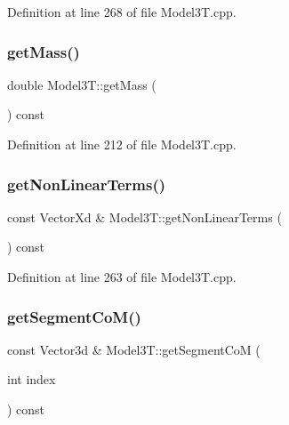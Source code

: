 Definition at line 268 of file Model3\+T.\+cpp.

\hypertarget{classModel3T_a226c740338e57180fafed23181d1ca85}{}\label{classModel3T_a226c740338e57180fafed23181d1ca85} 
\subsubsection{\texorpdfstring{get\+Mass()}{getMass()}}
{\footnotesize\ttfamily double Model3\+T\+::get\+Mass (\begin{DoxyParamCaption}{ }\end{DoxyParamCaption}) const\hspace{0.3cm}{\ttfamily [virtual]}}



Definition at line 212 of file Model3\+T.\+cpp.

\hypertarget{classModel3T_af41d3f87cb77877320f4c589d9cf7ffe}{}\label{classModel3T_af41d3f87cb77877320f4c589d9cf7ffe} 
\subsubsection{\texorpdfstring{get\+Non\+Linear\+Terms()}{getNonLinearTerms()}}
{\footnotesize\ttfamily const Vector\+Xd \& Model3\+T\+::get\+Non\+Linear\+Terms (\begin{DoxyParamCaption}{ }\end{DoxyParamCaption}) const\hspace{0.3cm}{\ttfamily [virtual]}}



Definition at line 263 of file Model3\+T.\+cpp.

\hypertarget{classModel3T_a7e3f88de763eb1faf3ba60dc032a99fb}{}\label{classModel3T_a7e3f88de763eb1faf3ba60dc032a99fb} 
\subsubsection{\texorpdfstring{get\+Segment\+Co\+M()}{getSegmentCoM()}}
{\footnotesize\ttfamily const Vector3d \& Model3\+T\+::get\+Segment\+CoM (\begin{DoxyParamCaption}\item[{int}]{index }\end{DoxyParamCaption}) const\hspace{0.3cm}{\ttfamily [virtual]}}



